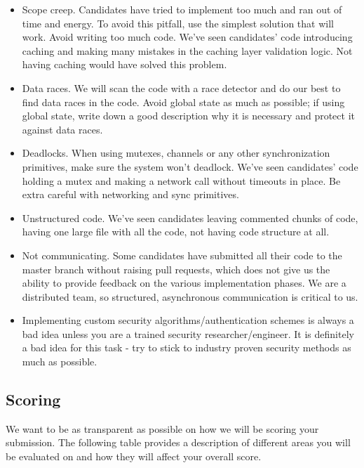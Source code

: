 \documentclass{article}
\begin{document}
    \begin{itemize}
    \item Scope creep. Candidates have tried to implement too much and ran out of time and energy. To avoid this pitfall, use the simplest solution that will work. Avoid writing too much code. We've seen candidates' code introducing caching and making many mistakes in the caching layer validation logic. Not having caching would have solved this problem.
    \item Data races. We will scan the code with a race detector and do our best to find data races in the code. Avoid global state as much as possible; if using global state, write down a good description why it is necessary and protect it against data races.
    \item Deadlocks. When using mutexes, channels or any other synchronization primitives, make sure the system won't deadlock. We've seen candidates' code holding a mutex and making a network call without timeouts in place. Be extra careful with networking and sync primitives.
    \item Unstructured code. We've seen candidates leaving commented chunks of code, having one large file with all the code, not having code structure at all.
    \item Not communicating. Some candidates have submitted all their code to the master branch without raising pull requests, which does not give us the ability to provide feedback on the various implementation phases. We are a distributed team, so structured, asynchronous communication is critical to us.
    \item Implementing custom security algorithms/authentication schemes is always a bad idea unless you are a trained security researcher/engineer. It is definitely a bad idea for this task - try to stick to industry proven security methods as much as possible.
    \end{itemize}

\subsection{Scoring}
    
We want to be as transparent as possible on how we will be scoring your submission.
The following table provides a description of different areas you will be evaluated on and how they will affect your overall score.
\end{document}
